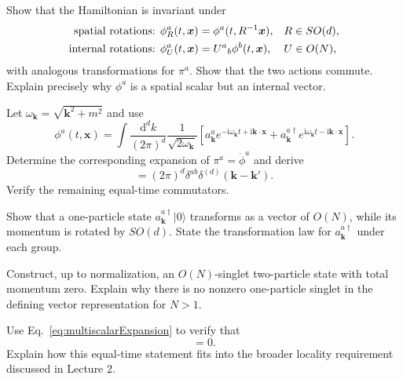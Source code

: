 \documentclass[11pt]{article}
\newcommand{\dd}{\mathrm{d}}
\newcommand{\ii}{\mathrm{i}}
\begin{document}
\begin{parts}
  \item Show that the Hamiltonian is invariant under
  \begin{align}
    \text{spatial rotations: }&
    \phi_R^a(t,\bm x)=\phi^a(t,R^{-1}\bm x),
    &&R\in SO(d),\notag\\
    \text{internal rotations: }&
    \phi_U^a(t,\bm x)=U^a{}_b\phi^b(t,\bm x),
    &&U\in O(N),
  \end{align}
  with analogous transformations for \(\pi^a\). Show that the two actions
  commute. Explain precisely why \(\phi^a\) is a spatial scalar but an
  internal vector.

  \item Let \(\omega_{\bm k}=\sqrt{\bm k^2+m^2}\) and use
  \begin{equation}
    \phi^a(t,\bm x)=
    \int\frac{\dd^d k}{(2\pi)^d}
    \frac{1}{\sqrt{2\omega_{\bm k}}}
    \left[
      a^a_{\bm k}e^{-\ii\omega_{\bm k}t+\ii\bm k\cdot\bm x}
      +a^{a\dagger}_{\bm k}
       e^{\ii\omega_{\bm k}t-\ii\bm k\cdot\bm x}
    \right].
    \label{eq:multiscalarExpansion}
  \end{equation}
  Determine the corresponding expansion of \(\pi^a=\dot\phi^a\) and derive
  \begin{equation}
    [a^a_{\bm k},a^{b\dagger}_{\bm k'}]
    =(2\pi)^d\delta^{ab}\delta^{(d)}(\bm k-\bm k').
    \label{eq:modeCCR}
  \end{equation}
  Verify the remaining equal-time commutators.

  \item Show that a one-particle state
  \(a^{a\dagger}_{\bm k}|0\rangle\) transforms as a vector of \(O(N)\), while
  its momentum is rotated by \(SO(d)\). State the transformation law for
  \(a^{a\dagger}_{\bm k}\) under each group.

  \item Construct, up to normalization, an \(O(N)\)-singlet two-particle state
  with total momentum zero. Explain why there is no nonzero one-particle
  singlet in the defining vector representation for \(N>1\).

  \item Use Eq.~\eqref{eq:multiscalarExpansion} to verify that
  \begin{equation}
    [\phi^a(t,\bm x),\phi^b(t,\bm y)]=0.
  \end{equation}
  Explain how this equal-time statement fits into the broader locality
  requirement discussed in Lecture 2.
\end{parts}
\end{document}
